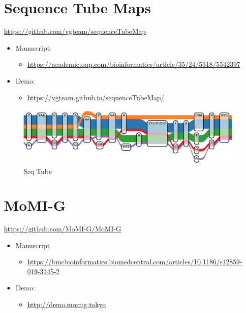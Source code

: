 \documentclass[
]{book}
\providecommand{\tightlist}{%
  \setlength{\itemsep}{0pt}\setlength{\parskip}{0pt}}
\begin{document}
\hypertarget{sequence-tube-maps}{%
\section{Sequence Tube Maps}\label{sequence-tube-maps}}

\url{https://github.com/vgteam/sequenceTubeMap}

\begin{itemize}
\tightlist
\item
  Manuscript:

  \begin{itemize}
  \tightlist
  \item
    \url{https://academic.oup.com/bioinformatics/article/35/24/5318/5542397}
  \end{itemize}
\item
  Demo:

  \begin{itemize}
  \tightlist
  \item
    \url{https://vgteam.github.io/sequenceTubeMap/}
  \end{itemize}
\end{itemize}

\begin{figure}
\centering
\includegraphics[width=1\textwidth,height=\textheight]{./Figures/SeqTube.png}
\caption{Seq Tube}
\end{figure}

\hypertarget{momi-g}{%
\section{MoMI-G}\label{momi-g}}

\url{https://github.com/MoMI-G/MoMI-G}

\begin{itemize}
\tightlist
\item
  Manuscript

  \begin{itemize}
  \tightlist
  \item
    \url{https://bmcbioinformatics.biomedcentral.com/articles/10.1186/s12859-019-3145-2}
  \end{itemize}
\item
  Demo:

  \begin{itemize}
  \tightlist
  \item
    \url{http://demo.momig.tokyo}
  \end{itemize}
\end{itemize}
\end{document}
